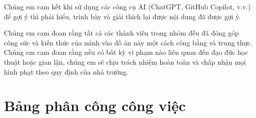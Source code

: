 \documentclass[a4paper]{article}
\begin{document}
Chúng em cam kết khi sử dụng các công cụ AI (ChatGPT, GitHub Copilot, v.v.) để gợi ý thì phải hiểu, trình bày và giải thích lại được nội dung đã được gợi ý.

Chúng em cam đoan rằng tất cả các thành viên trong nhóm đều đã đóng góp công sức và kiến thức của mình vào đồ án này một cách công bằng và trung thực. Chúng em cam đoan rằng nếu có bất kỳ vi phạm nào liên quan đến đạo đức học thuật hoặc gian lận, chúng em sẽ chịu trách nhiệm hoàn toàn và chấp nhận mọi hình phạt theo quy định của nhà trường.

\section{Bảng phân công công việc}
\end{document}
